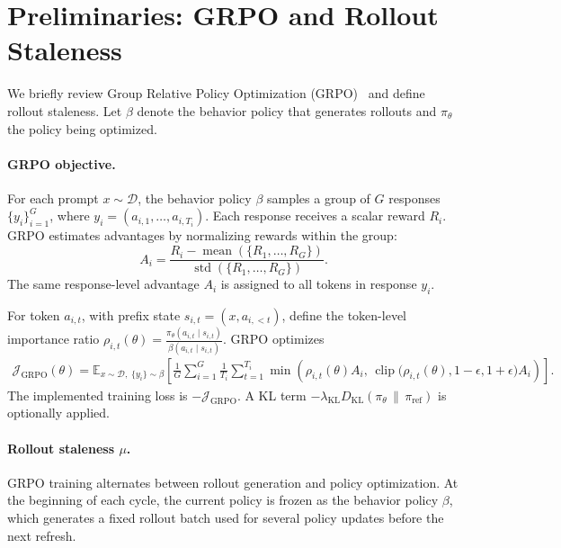 \section{Preliminaries: GRPO and Rollout Staleness}
\label{sec:preliminaries}
We briefly review Group Relative Policy Optimization
(GRPO)~\citep{shao2024deepseekmathpushinglimitsmathematical} and define rollout
staleness. Let $\beta$ denote the behavior policy that generates rollouts and
$\pi_\theta$ the policy being optimized.

\paragraph{GRPO objective.} For each prompt $x\sim\mathcal D$, the behavior policy $\beta$ samples a group
of $G$ responses $\{y_i\}_{i=1}^G$, where $y_i=(a_{i,1},\ldots,a_{i,T_i})$.
Each response receives a scalar reward $R_i$. GRPO estimates advantages by
normalizing rewards within the group:
\begin{equation}
    A_i
    =
    \frac{
        R_i - \operatorname{mean}(\{R_1,\ldots,R_G\})
    }{
        \operatorname{std}(\{R_1,\ldots,R_G\})
    } .
    \label{eq:grpo-adv}
\end{equation}
The same response-level advantage $A_i$ is assigned to all tokens in response
$y_i$.

For token $a_{i,t}$, with prefix state $s_{i,t}=(x,a_{i,<t})$, define the
token-level importance ratio
$
    \rho_{i,t}(\theta)
    =
    \frac{
        \pi_\theta(a_{i,t}\mid s_{i,t})
    }{
        \beta(a_{i,t}\mid s_{i,t})
    } .
    \label{eq:token-ratio-prelim}
$
GRPO optimizes
\begin{equation}
\begin{aligned}
    \mathcal J_{\mathrm{GRPO}}(\theta)
    =
    \mathbb E_{x\sim\mathcal D,\; \{y_i\}\sim\beta}
    \left[
    \frac{1}{G}\sum_{i=1}^G
    \frac{1}{T_i}\sum_{t=1}^{T_i}
    \min\left(
        \rho_{i,t}(\theta) A_i,\,
        \operatorname{clip}
        \big(\rho_{i,t}(\theta),1-\epsilon,1+\epsilon\big) A_i
    \right)
    \right].
\end{aligned}
\label{eq:grpo-obj}
\end{equation}
The implemented training loss is $-\mathcal J_{\mathrm{GRPO}}$. 
A KL term $-\lambda_{\mathrm{KL}} D_{\mathrm{KL}}\!\left(
\pi_\theta \,\|\, \pi_{\mathrm{ref}}
\right)$ is optionally applied.

\paragraph{Rollout staleness $\mu$.} GRPO training alternates between rollout generation and policy optimization.
At the beginning of each cycle, the current policy is frozen as the behavior
policy $\beta$, which generates a fixed rollout batch used for several policy
updates before the next refresh.

